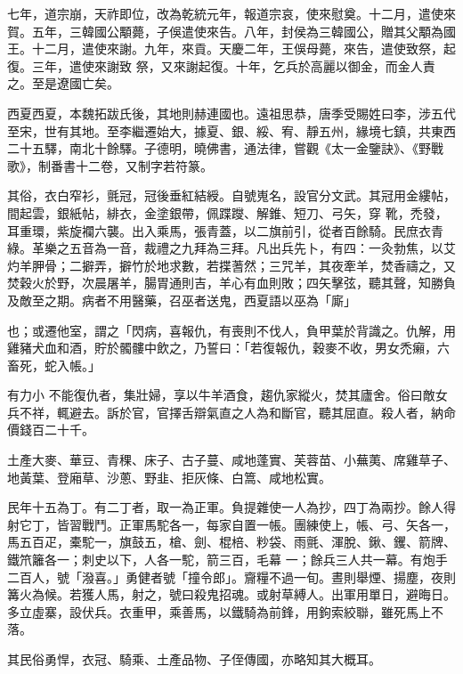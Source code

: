 \begin{pinyinscope}
 七年，道宗崩，天祚即位，改為乾統元年，報道宗哀，使來慰奠。十二月，遣使來賀。五年，三韓國公顒薨，子俁遣使來告。八年，封侯為三韓國公，贈其父顒為國王。十二月，遣使來謝。九年，來貢。天慶二年，王俁母薨，來告，遣使致祭，起復。三年，遣使來謝致
 祭，又來謝起復。十年，乞兵於高麗以御金，而金人責之。至是遼國亡矣。



 西夏西夏，本魏拓跋氏後，其地則赫連國也。遠祖思恭，唐季受賜姓曰李，涉五代至宋，世有其地。至李繼遷始大，據夏、銀、綏、宥、靜五州，緣境七鎮，共東西二十五驛，南北十餘驛。子德明，曉佛書，通法律，嘗觀《太一金鑒訣》、《野戰歌》，制番書十二卷，又制字若符篆。



 其俗，衣白窄衫，氈冠，冠後垂紅結綬。自號嵬名，設官分文武。其冠用金縷帖，間起雲，銀紙帖，緋衣，金塗銀帶，佩蹀躞、解錐、短刀、弓矢，穿
 靴，禿發，耳重環，紫旋襴六襲。出入乘馬，張青蓋，以二旗前引，從者百餘騎。民庶衣青綠。革樂之五音為一音，裁禮之九拜為三拜。凡出兵先卜，有四：一灸勃焦，以艾灼羊胛骨；二擗弄，擗竹於地求數，若揲蓍然；三咒羊，其夜牽羊，焚香禱之，又焚穀火於野，次晨屠羊，腸胃通則吉，羊心有血則敗；四矢擊弦，聽其聲，知勝負及敵至之期。病者不用醫藥，召巫者送鬼，西夏語以巫為「廝」



 也；或遷他室，謂之「閃病，喜報仇，有喪則不伐人，負甲葉於背識之。仇解，用雞豬犬血和酒，貯於髑髏中飲之，乃誓曰：「若復報仇，穀麥不收，男女禿癩，六畜死，蛇入帳。」



 有力小
 不能復仇者，集壯婦，享以牛羊酒食，趨仇家縱火，焚其廬舍。俗曰敵女兵不祥，輒避去。訴於官，官擇舌辯氣直之人為和斷官，聽其屈直。殺人者，納命價錢百二十千。



 土產大麥、華豆、青稞、床子、古子蔓、咸地蓬實、芙蓉苗、小蕪荑、席雞草子、地黃葉、登廂草、沙蔥、野韭、拒灰條、白篙、咸地松實。



 民年十五為丁。有二丁者，取一為正軍。負提雜使一人為抄，四丁為兩抄。餘人得射它丁，皆習戰鬥。正軍馬駝各一，每家自置一帳。團練使上，帳、弓、矢各一，馬五百疋，橐駝一，旗鼓五，槍、劍、棍棓、粆袋、雨氈、渾脫、鍬、钁、箭牌、鐵笊籬各一；刺史以下，人各一駝，箭三百，毛幕
 一；餘兵三人共一幕。有炮手二百人，號「潑喜。」勇健者號「撞令郎」。齎糧不過一旬。晝則舉煙、揚塵，夜則篝火為候。若獲人馬，射之，號曰殺鬼招魂。或射草縛人。出軍用單日，避晦日。多立虛寨，設伏兵。衣重甲，乘善馬，以鐵騎為前鋒，用鉤索絞聯，雖死馬上不落。



 其民俗勇悍，衣冠、騎乘、土產品物、子侄傳國，亦略知其大概耳。




\end{pinyinscope}
